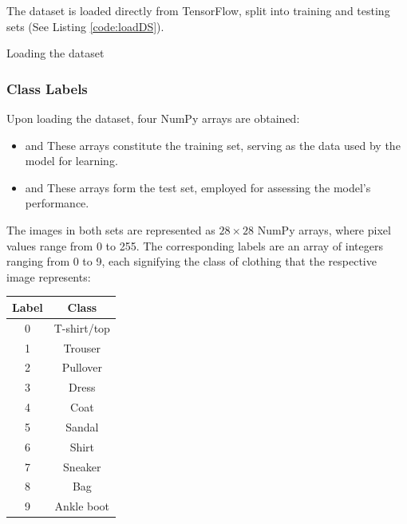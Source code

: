 The dataset is loaded directly from TensorFlow, split into training and testing sets (See Listing \ref{code:loadDS}).

\begin{code}[h!]
	    
	
	\caption{Loading the dataset}
	\label{code:loadDS}
\end{code}

\subsubsection{Class Labels}

Upon loading the dataset, four NumPy arrays are obtained:

\begin{itemize}
	\item {} and  These arrays constitute the training set, serving as the data used by the model for learning.
	
	\item {} and  These arrays form the test set, employed for assessing the model's performance.
\end{itemize}

The images in both sets are represented as $28 \times 28$ NumPy arrays, where pixel values range from 0 to 255. The corresponding labels are an array of integers ranging from 0 to 9, each signifying the class of clothing that the respective image represents:

\begin{center}
	\begin{tabular}{|c|c|}
		\hline
		\textbf{Label} & \textbf{Class} \\
		\hline
		0 & T-shirt/top \\
		1 & Trouser \\
		2 & Pullover \\
		3 & Dress \\
		4 & Coat \\
		5 & Sandal \\
		6 & Shirt \\
		7 & Sneaker \\
		8 & Bag \\
		9 & Ankle boot \\
		\hline
	\end{tabular}
\end{center}

